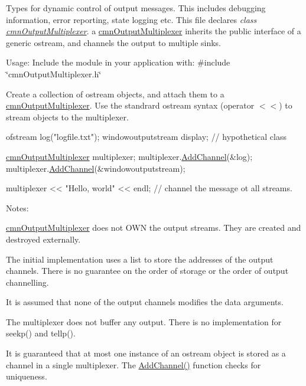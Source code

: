 Types for dynamic control of output messages. This includes debugging information, error reporting, state logging etc. This file declares {\itshape class \hyperlink{classcmn_output_multiplexer}{cmn\+Output\+Multiplexer}}. a \hyperlink{classcmn_output_multiplexer}{cmn\+Output\+Multiplexer} inherits the public interface of a generic ostream, and channels the output to multiple sinks.

Usage\+: Include the module in your application with\+: \#include \char`\"{}cmn\+Output\+Multiplexer.\+h\char`\"{}

Create a collection of ostream objects, and attach them to a \hyperlink{classcmn_output_multiplexer}{cmn\+Output\+Multiplexer}. Use the standrard ostream syntax (operator $<$$<$) to stream objects to the multiplexer.


\begin{DoxyCode}
ofstream log(\textcolor{stringliteral}{"logfile.txt"});
windowoutputstream display;  \textcolor{comment}{// hypothetical class}

\hyperlink{classcmn_output_multiplexer}{cmnOutputMultiplexer} multiplexer;
multiplexer.\hyperlink{classcmn_output_multiplexer_a70d534895f21217e1e7e75e837fc65e7}{AddChannel}(&log);
multiplexer.\hyperlink{classcmn_output_multiplexer_a70d534895f21217e1e7e75e837fc65e7}{AddChannel}(&windowoutputstream);

multiplexer << \textcolor{stringliteral}{"Hello, world"} << endl;  \textcolor{comment}{// channel the message ot all streams.}
\end{DoxyCode}


Notes\+:
\begin{DoxyEnumerate}
\item \hyperlink{classcmn_output_multiplexer}{cmn\+Output\+Multiplexer} does not O\+W\+N the output streams. They are created and destroyed externally.
\item The initial implementation uses a list to store the addresses of the output channels. There is no guarantee on the order of storage or the order of output channelling.
\item It is assumed that none of the output channels modifies the data arguments.
\item The multiplexer does not buffer any output. There is no implementation for seekp() and tellp().
\item It is guaranteed that at most one instance of an ostream object is stored as a channel in a single multiplexer. The \hyperlink{classcmn_output_multiplexer_a70d534895f21217e1e7e75e837fc65e7}{Add\+Channel()} function checks for uniqueness. 
\end{DoxyEnumerate}

